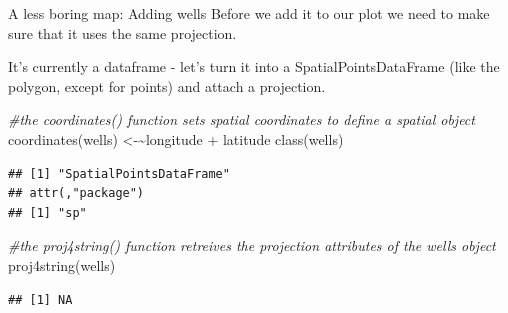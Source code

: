 \documentclass[
  ignorenonframetext,
]{beamer}
\newenvironment{Shaded}{\begin{snugshade}}{\end{snugshade}}
\newcommand{\CommentTok}[1]{\textcolor[rgb]{0.56,0.35,0.01}{\textit{#1}}}
\newcommand{\ErrorTok}[1]{\textcolor[rgb]{0.64,0.00,0.00}{\textbf{#1}}}
\newcommand{\FunctionTok}[1]{\textcolor[rgb]{0.00,0.00,0.00}{#1}}
\newcommand{\NormalTok}[1]{#1}
\newcommand{\OtherTok}[1]{\textcolor[rgb]{0.56,0.35,0.01}{#1}}
\newcommand{\SpecialCharTok}[1]{\textcolor[rgb]{0.00,0.00,0.00}{#1}}
\begin{document}
\begin{frame}[fragile]{A less boring map: Adding wells}
\protect\hypertarget{a-less-boring-map-adding-wells-1}{}
Before we add it to our plot we need to make sure that it uses the same
projection.

It's currently a dataframe - let's turn it into a SpatialPointsDataFrame
(like the polygon, except for points) and attach a projection.

\tiny

\begin{Shaded}
\begin{Highlighting}[]
\CommentTok{\#the coordinates() function sets spatial coordinates to define a spatial object}
\FunctionTok{coordinates}\NormalTok{(wells) }\OtherTok{\textless{}{-}}\ErrorTok{\textasciitilde{}}\NormalTok{longitude }\SpecialCharTok{+}\NormalTok{ latitude}
\FunctionTok{class}\NormalTok{(wells)}
\end{Highlighting}
\end{Shaded}

\begin{verbatim}
## [1] "SpatialPointsDataFrame"
## attr(,"package")
## [1] "sp"
\end{verbatim}

\begin{Shaded}
\begin{Highlighting}[]
\CommentTok{\#the proj4string() function retreives the projection attributes of the wells object}
\FunctionTok{proj4string}\NormalTok{(wells)}
\end{Highlighting}
\end{Shaded}

\begin{verbatim}
## [1] NA
\end{verbatim}
\end{frame}
\end{document}
